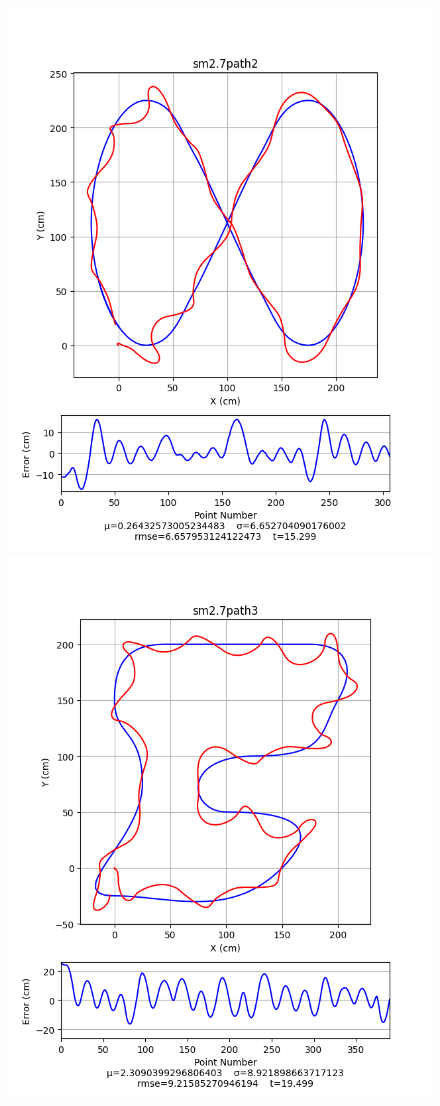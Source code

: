 \documentclass[mla8alt]{mla}
\begin{document}
\begin{paper}
\begin{figure}[H]
\includegraphics[width=\linewidth]{pathData/smpath2}
\endminipage\\
\includegraphics[width=\linewidth]{pathData/smpath3}

\end{figure}
\end{paper}
\end{document}
